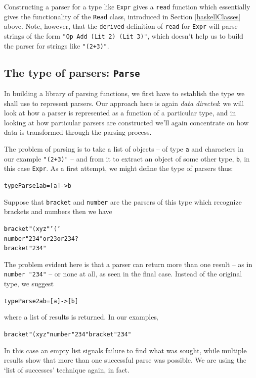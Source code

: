 Constructing a parser for a type like \texttt{Expr} gives a \texttt{read} function
which essentially gives the functionality of the \texttt{Read} class, introduced in
Section \ref{haskellClasses} above. Note, however, that the
\texttt{derived} definition of \texttt{read} for \texttt{Expr} will
parse strings of the form \texttt{"Op Add (Lit 2) (Lit 3)"}, which doesn't help us to build the parser for strings like \texttt{"(2+3)"}.

\subsection*{The type of parsers: \texttt{Parse}}

In building a library of parsing functions, we first have to establish the
type we shall use to represent parsers.  Our approach here is again \emph{data directed}: we will look at how a parser is represented as a function of a particular type, and in looking at how particular parsers are constructed we'll again concentrate on how data is transformed through the parsing process.
 
The problem of parsing is to take a list of objects -- of type
\texttt{a} and
characters in our example \texttt{"(2+3)"} -- and from it to extract an object
of some other type, \texttt{b}, in this case \texttt{Expr}. As a first attempt, we
might define the type of parsers thus:
\begin{alltt}
type Parse1 a b = [a] -> b
\end{alltt}
Suppose that \texttt{bracket} and \texttt{number} are the parsers of this type
which recognize brackets and numbers then we have
\begin{alltt}
bracket "(xyz" \step '('
number  "234"   {\rm{}or} 23 {\rm{}or} 234{\rm{}?}
bracket "234"  
\end{alltt}
The problem evident here is that a parser can return more than one result --
as in \texttt{number "234"} -- or none at all, as seen in the final case.
Instead of the original type, we suggest
\begin{alltt}
type Parse2 a b = [a] -> [b]
\end{alltt}
where a list of results is returned. In our examples,
\begin{alltt}
bracket "(xyz" \step ['(']
number  "234"  \step [2 , 23 , 234]
bracket "234"  \step []
\end{alltt}
In this case an empty list signals failure to find what was sought, while
multiple results show that more than one successful parse was possible. We
are using the `list of successes' technique again, in fact.

